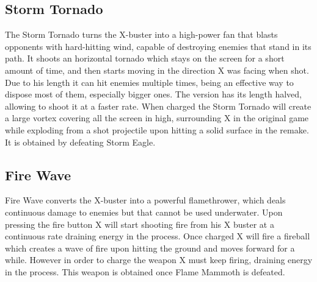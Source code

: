 \subsection{Storm Tornado}\label{Storm_tornado}
The Storm Tornado turns the X-buster into a high-power fan that blasts opponents with hard-hitting wind, capable of destroying enemies that stand in its path. It shoots an horizontal tornado which stays on the screen for a short amount of time, and then starts moving in the direction X was facing when shot. Due to his length it can hit enemies multiple times, being an effective way to dispose most of them, especially bigger ones.  The \mhx version has its length halved, allowing to shoot it at a faster rate. When charged the Storm Tornado will create a large vortex covering all the screen in high, surrounding X in the original game while exploding from a shot projectile upon hitting a solid surface in the remake.\cite{wiki:Storm_tornado} It is obtained by defeating Storm Eagle.

\subsection{Fire Wave}\label{Fire_wave}
Fire Wave converts the X-buster into a powerful flamethrower, which deals continuous damage to enemies but that cannot be used underwater. Upon pressing the fire button X will start shooting fire from his X buster at a continuous rate draining energy in the process. Once charged X will fire a fireball which creates a wave of fire upon hitting the ground and moves forward for a while. However in order to charge the weapon X must keep firing, draining energy in the process. This weapon is obtained once Flame Mammoth is defeated. 

